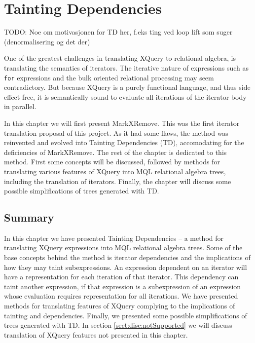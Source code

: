 \chapter{Tainting Dependencies}
\label{sect:translation}
\label{chapter:translation}

TODO: Noe om motivasjonen for TD her, f.eks ting ved loop lift som suger
(denormalisering og det der)

One of the greatest challenges in translating XQuery to relational algebra, is translating the semantics of
iterators. The iterative nature of expressions such as \texttt{for} expressions and the bulk oriented relational
processing may seem contradictory. But because XQuery is a purely functional language, and thus side effect free,
it is semantically sound to evaluate all iterations of the iterator body in
parallel.

In this chapter we will first present MarkXRemove. This was the first iterator translation proposal of this
project. As it had some flaws, the method was reinvented and evolved into Tainting Dependencies (TD), accomodating
for the deficiencies of MarkXRemove. The rest of the chapter is dedicated to this method. First some concepts will
be discussed, followed by methods for translating various features of XQuery into MQL relational algebra trees,
including the translation of iterators. Finally, the chapter will discuss some possible simplifications of trees
generated with TD.













\section{Summary}
\label{sect:trans:summary}

In this chapter we have presented Tainting Dependencies -- a method for
translating XQuery expressions into MQL relational algebra trees. Some of the
base concepts behind the method is iterator dependencies and the implications
of how they may taint subexpressions. An expression dependent on an iterator
will have a representation for each iteration of that iterator. This
dependency can taint another expression, if that expression is a subexpression
of an expression whose evaluation requires representation for all iterations.
We have presented methods for translating features of XQuery complying to the
implications of tainting and dependencies. Finally, we presented some possible
simplifications of trees generated with TD. In section
\ref{sect:disc:notSupported} we will discuss translation of XQuery features
not presented in this chapter.
